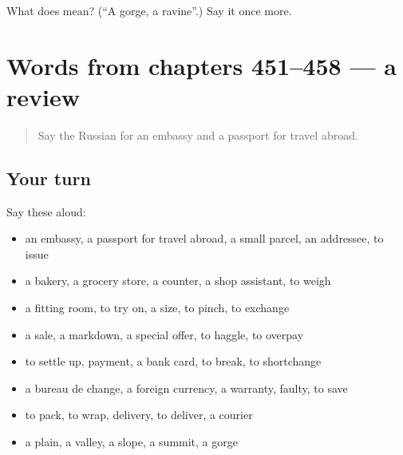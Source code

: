 \begin{tcolorbox}[breakable,colback=teal!4,colframe=teal!35!black,title={Before you move on}]
What does  mean? (\textquotedblleft{}A gorge, a ravine\textquotedblright{}.) Say it once more.
\end{tcolorbox}
\section[(dialogue)]{Words from chapters 451–458 — a review}

\label{lesson:RU-R458-review-451-458}



\begin{quote}
Say the Russian for an embassy and a passport for travel abroad.
\end{quote}

\subsection*{Your turn}
Say these aloud:

\begin{itemize}
\raggedright
  \item an embassy, a passport for travel abroad, a small parcel, an addressee, to issue
  \item a bakery, a grocery store, a counter, a shop assistant, to weigh
  \item a fitting room, to try on, a size, to pinch, to exchange
  \item a sale, a markdown, a special offer, to haggle, to overpay
  \item to settle up, payment, a bank card, to break, to shortchange
  \item a bureau de change, a foreign currency, a warranty, faulty, to save
  \item to pack, to wrap, delivery, to deliver, a courier
  \item a plain, a valley, a slope, a summit, a gorge
\end{itemize}

